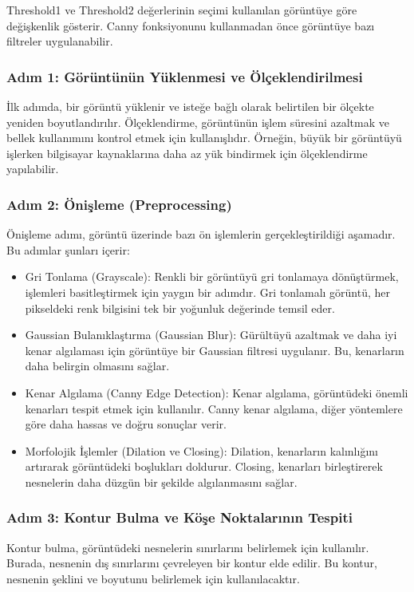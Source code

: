 \documentclass[11pt,a4paper]{report}
\begin{document}
\begin{justify}
   Threshold1 ve Threshold2 değerlerinin seçimi kullanılan görüntüye göre değişkenlik gösterir. Canny fonksiyonunu kullanmadan önce görüntüye bazı filtreler uygulanabilir.
   
   
   
   
   \subsubsection{Adım 1: Görüntünün Yüklenmesi ve Ölçeklendirilmesi}
   İlk adımda, bir görüntü yüklenir ve isteğe bağlı olarak belirtilen bir ölçekte yeniden boyutlandırılır. Ölçeklendirme, görüntünün işlem süresini azaltmak ve bellek kullanımını kontrol etmek için kullanışlıdır. Örneğin, büyük bir görüntüyü işlerken bilgisayar kaynaklarına daha az yük bindirmek için ölçeklendirme yapılabilir.
   
   \subsubsection{Adım 2: Önişleme (Preprocessing)}
   Önişleme adımı, görüntü üzerinde bazı ön işlemlerin gerçekleştirildiği aşamadır. Bu adımlar şunları içerir:
   \begin{itemize}
   	\item Gri Tonlama (Grayscale): Renkli bir görüntüyü gri tonlamaya dönüştürmek, işlemleri basitleştirmek için yaygın bir adımdır. Gri tonlamalı görüntü, her pikseldeki renk bilgisini tek bir yoğunluk değerinde temsil eder.
   	
   	\item Gaussian Bulanıklaştırma (Gaussian Blur): Gürültüyü azaltmak ve daha iyi kenar algılaması için görüntüye bir Gaussian filtresi uygulanır. Bu, kenarların daha belirgin olmasını sağlar.
   	
   	\item Kenar Algılama (Canny Edge Detection): Kenar algılama, görüntüdeki önemli kenarları tespit etmek için kullanılır. Canny kenar algılama, diğer yöntemlere göre daha hassas ve doğru sonuçlar verir.
   	
   	\item Morfolojik İşlemler (Dilation ve Closing): Dilation, kenarların kalınlığını artırarak görüntüdeki boşlukları doldurur. Closing, kenarları birleştirerek nesnelerin daha düzgün bir şekilde algılanmasını sağlar.
   \end{itemize}
   
   \subsubsection{Adım 3: Kontur Bulma ve Köşe Noktalarının Tespiti}
   Kontur bulma, görüntüdeki nesnelerin sınırlarını belirlemek için kullanılır. Burada, nesnenin dış sınırlarını çevreleyen bir kontur elde edilir. Bu kontur, nesnenin şeklini ve boyutunu belirlemek için kullanılacaktır.
   

\end{justify}
\end{document}
